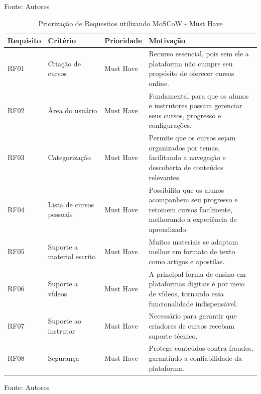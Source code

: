\begin{apendicesenv}
\begin{table}[h]
\vspace{5mm}
{\footnotesize Fonte: Autores} 

\end{table}


\begin{table}[h]
    \centering
    \caption{Priorização de Requesitos utilizando MoSCoW - Must Have}
    \label{tab:priorizacao_moscow}
    \begin{adjustbox}{width=\textwidth}
        \begin{tabular}{|p{2.5cm}|p{5cm}|p{5cm}|p{4cm}|}
        \hline
        \textbf{Requisito} & \textbf{Critério} & \textbf{Prioridade} & \textbf{Motivação} \\
        \hline
        RF01 & Criação de cursos & Must Have & Recurso essencial, pois sem ele a plataforma não cumpre seu propósito de oferecer cursos online. \\
        \hline
        RF02 & Área do usuário & Must Have & Fundamental para que os alunos e instrutores possam gerenciar seus cursos, progresso e configurações. \\
        \hline
        RF03 & Categorização & Must Have & Permite que os cursos sejam organizados por temas, facilitando a navegação e descoberta de conteúdos relevantes. \\
        \hline
        RF04 & Lista de cursos pessoais & Must Have & Possibilita que os alunos acompanhem seu progresso e retomem cursos facilmente, melhorando a experiência de aprendizado. \\
        \hline
        RF05 & Suporte a material escrito & Must Have & Muitos materiais se adaptam melhor em formato de texto como artigos e apostilas. \\
        \hline
        RF06 & Suporte a vídeos & Must Have & A principal forma de ensino em plataformas digitais é por meio de vídeos, tornando essa funcionalidade indispensável. \\
        \hline
        RF07 & Suporte ao instrutor & Must Have & Necessário para garantir que criadores de cursos recebam suporte técnico. \\
        \hline
        RF08 & Segurança & Must Have & Protege conteúdos contra fraudes, garantindo a confiabilidade da plataforma. \\
        \hline
    \end{tabular}
\end{adjustbox}

\vspace{5mm}
{\footnotesize Fonte: Autores} 
\end{table}



\end{apendicesenv}
